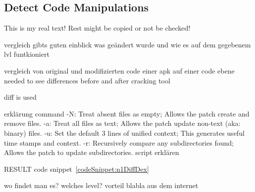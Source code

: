 \subsection{Detect Code Manipulations} \label{subsubsection:forensics-tools-diff}
This is my real text! Rest might be copied or not be checked!


vergleich gibts guten einblick was geändert wurde und wie es auf dem gegebenem lvl funtkioniert\newline

vergleich von original und modifizierten code einer apk auf einer code ebene\newline
needed to see differences before and after cracking tool\newline

diff is used\newline




erklärung command \cite{diffUbuntu}
-N: Treat absent files as empty; Allows the patch create and remove files.\newline
-a: Treat all files as text; Allows the patch update non-text (aka: binary) files.\newline
-u: Set the default 3 lines of unified context; This generates useful time stamps and context.\newline
-r: Recursively compare any subdirectories found; Allows the patch to update subdirectories.\newline
script erklären\newline

RESULT code snippet~\ref{codeSnippet:n1DiffDex}

wo findet man es?\newline
welches level?\newline
vorteil\newline
blabla aus dem internet\newline
